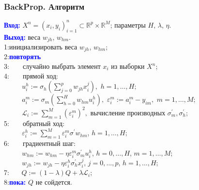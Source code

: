 \documentclass[10pt]{beamer}
\begin{document}
\begin{frame}
\frametitle{BackProp. Алгоритм}
\textcolor{blue}{\bfseries Вход:} $X^n = (x_i, y_i)_{i=1}^{n} \subset \mathbb{R}^p \times \mathbb{R}^M$; параметры $H$, $\lambda$, $\eta$.\\
\textcolor{blue}{\bfseries Выход:} веса $w_{jh}$, $w_{hm}$. \\
1:инициализировать веса $w_{jh}$, $w_{hm}$;\\
2:\textcolor{blue}{\bfseries повторять} \\
3:$\quad \quad$случайно выбрать элемент  $x_i$ из выборки $X^n$; \\
4:$\quad \quad$прямой ход:\\
 $\quad \quad \,\,$ $u_i^h := \sigma_h \left( \sum_{j=0}^{p} w_{jh} x^j_{i}\right), \,\, h=1,\ldots,H;$\\
 $\quad \quad \,\,$ $a_i^m := \sigma_m \left( \sum_{h=0}^{H} w_{hm} u_{i}^h \right), \,\, \varepsilon_i^m := a_i^m - y_{im}, \,\, m=1,\ldots,M;$\\
 $\quad \quad \,\,$ $ \mathscr{L}_i := \sum_{m=1}^{M}(\varepsilon_i^m)^2, \text{ вычисление производных } \sigma_m^{'}, \sigma_h^{'}$;\\
5:$\quad \quad$обратный ход:\\
 $\quad \quad \,\,$ $\varepsilon_i^h := \sum_{m=1}^M \varepsilon_i^m \sigma^{'} w_{hm}$, $h=1,\ldots,H$;\\
6:$\quad \quad$градиентный шаг:\\
 $\quad \quad \,\,$ $w_{hm} := w_{hm} - \eta \varepsilon_i^m \sigma^{'}_m u_i^h$, $h=0,\ldots,H$, $ m=1,\ldots,M$;\\ 
 $\quad \quad \,\,$ $w_{jh} := w_{jh} - \eta \varepsilon_i^h \sigma^{'}_h x^j_{i}$, $j=0,\ldots,p$, $ h=1,\ldots,H$;\\
7:$\quad \,\,\,$ $Q := (1-\lambda) Q + \lambda\mathscr{L}_i$;\\
8:\textcolor{blue}{\bfseries пока:} $Q$ не сойдется.
\end{frame} 
 
\end{document}
